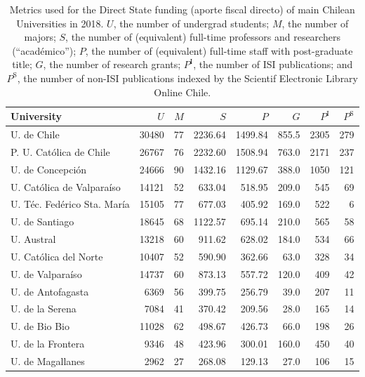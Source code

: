 \documentclass[twocolumn]{article}
\def\npup{\ensuremath{U}}
\def\nmaj{\ensuremath{M}}
\def\nprof{\ensuremath{S}}
\def\ngrad{\ensuremath{P}}
\def\ngrant{\ensuremath{G}}
\def\nisi{\ensuremath{P^\text{I}}}
\def\nscielo{\ensuremath{P^\text{S}}}
\begin{document}
\begin{table}[t]
\caption{Metrics used for the Direct State funding (aporte fiscal directo) of
main Chilean Universities in 2018. \npup{}, the number of
undergrad students; \nmaj{}, the number of majors; \nprof{}, the number of
(equivalent) full-time professors and researchers (``académico''); \ngrad{},
the number of (equivalent) full-time staff with post-graduate title; \ngrant{},
the number of research grants; $\nisi$, the number of ISI publications; and
$\nscielo$, the number of non-ISI publications indexed by the Scientif
Electronic Library Online Chile.}
\label{tab:metrics}
\centering\footnotesize
\begin{tabular}{l rrrrrrr}
\hline
University                 & \npup  & \nmaj &\nprof  &\ngrad &\ngrant& \nisi&\nscielo\\
\hline\hline
U. de Chile               & 30480 	& 77 &   2236.64&1499.84&855.5  &  2305&	279  \\
P. U. Católica de Chile    & 26767 	& 76 &   2232.60&1508.94&763.0  &  2171&	237  \\
U. de Concepción           & 24666 	& 90 &   1432.16&1129.67&388.0  &  1050&	121  \\
U. Católica de Valparaíso  & 14121 	& 52 &    633.04& 518.95&209.0  &   545&	 69  \\
U. Téc. Fedérico Sta. María& 15105 	& 77 &    677.03& 405.92&169.0  &   522&	  6  \\
U. de Santiago             & 18645 	& 68 &   1122.57& 695.14&210.0  &   565&	 58  \\
U. Austral                 & 13218 	& 60 &    911.62& 628.02&184.0  &   534&	 66  \\
U. Católica del Norte      & 10407 	& 52 &    590.90& 362.66& 63.0  &   328&	 34  \\
U. de Valparaíso           & 14737 	& 60 &    873.13& 557.72&120.0  &   409&	 42  \\
U. de Antofagasta          &  6369 	& 56 &    399.75& 256.79& 39.0  &   207&	 11  \\
U. de la Serena            &  7084 	& 41 &    370.42& 209.56& 28.0  &   165&	 14  \\
U. de Bio Bio              & 11028 	& 62 &    498.67& 426.73& 66.0  &   198&	 26  \\
U. de la Frontera          &  9346 	& 48 &    423.96& 300.01&160.0  &   450&	 40  \\
U. de Magallanes           &  2962 	& 27 &    268.08& 129.13& 27.0  &   106&	 15  \\

\end{tabular}
\end{table}
\end{document}
